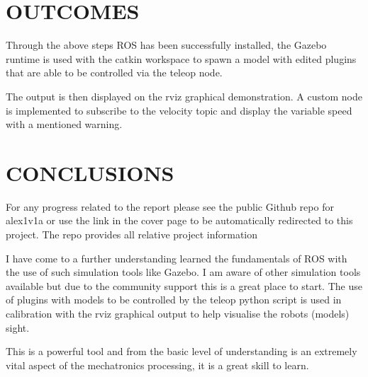 \documentclass[a4paper, 10pt]{IEEEconf}
\begin{document}

\section{OUTCOMES}

Through the above steps ROS has been successfully installed, the Gazebo runtime is used with the catkin workspace to spawn a model with edited plugins that are able to be controlled via the teleop node. 

The output is then displayed on the rviz graphical demonstration. A custom node is implemented to subscribe to the velocity topic and display the variable speed with a mentioned warning.



\section{CONCLUSIONS}

For any progress related to the report please see the public Github repo for alex1v1a or use the link in the cover page to be automatically redirected to this project. The repo provides all relative project information

I have come to a further understanding learned the fundamentals of ROS with the use of such simulation tools like Gazebo. I am aware of other simulation tools available but due to the community support this is a great place to start. The use of plugins with models to be controlled by the teleop python script is used in calibration with the rviz graphical output to help visualise the robots (models) sight.

This is a powerful tool and from the basic level of understanding is an extremely vital aspect of the mechatronics processing, it is a great skill to learn.


%
%


%
\end{document}
